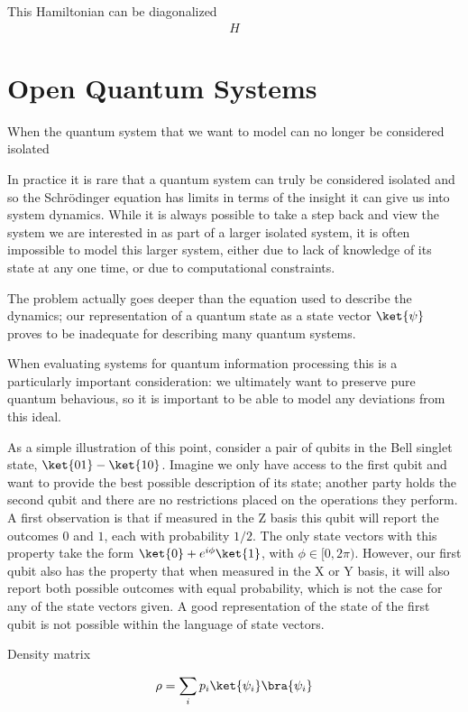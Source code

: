 This Hamiltonian can be diagonalized
\begin{align}
  H 
\end{align}

\section{Open Quantum Systems}

When the quantum system that we want to model can no longer be considered isolated

In practice it is rare that a quantum system can truly be considered isolated and so the Schr\"{o}dinger equation has limits in terms of the insight it can give us into system dynamics. While it is always possible to take a step back and view the system we are interested in as part of a larger isolated system, it is often impossible to model this larger system, either due to lack of knowledge of its state at any one time, or due to computational constraints.

The problem actually goes deeper than the equation used to describe the dynamics; our representation of a quantum state as a state vector $\ket{\psi}$ proves to be inadequate for describing many quantum systems.

When evaluating systems for quantum information processing this is a particularly important consideration: we ultimately want to preserve pure quantum behavious, so it is important to be able to model any deviations from this ideal.

As a simple illustration of this point, consider a pair of qubits in the Bell singlet state, $\ket{01} - \ket{10}$. Imagine we only have access to the first qubit and want to provide the best possible description of its state; another party holds the second qubit and there are no restrictions placed on the operations they perform. A first observation is that if measured in the Z basis this qubit will report the outcomes $0$ and $1$, each with probability $1/2$. The only state vectors with this property take the form $\ket{0} + e^{i\phi}\ket{1}$, with $\phi \in [0, 2\pi)$. However, our first qubit also has the property that when measured in the X or Y basis, it will also report both possible outcomes with equal probability, which is not the case for any of the state vectors given. A good representation of the state of the first qubit is not possible within the language of state vectors.

Density matrix

\begin{align}
  \rho = \sum_i p_i \ket{\psi_i}\bra{\psi_i} 
\end{align}

